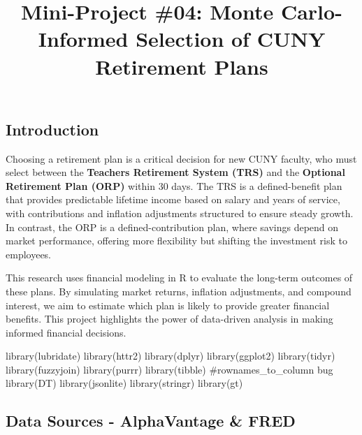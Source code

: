 \documentclass[
  letterpaper,
  DIV=11,
  numbers=noendperiod]{scrartcl}
\title{Mini-Project \#04: Monte Carlo-Informed Selection of CUNY
Retirement Plans}
\author{}
\date{}
\newenvironment{Shaded}{\begin{snugshade}}{\end{snugshade}}
\newcommand{\CommentTok}[1]{\textcolor[rgb]{0.37,0.37,0.37}{#1}}
\newcommand{\FunctionTok}[1]{\textcolor[rgb]{0.28,0.35,0.67}{#1}}
\newcommand{\NormalTok}[1]{\textcolor[rgb]{0.00,0.23,0.31}{#1}}
\renewcommand*\contentsname{Table of contents}
\newcommand\contentsname{Table of contents}
\begin{document}
\maketitle

\renewcommand*\contentsname{Outline}
{
\hypersetup{linkcolor=}
\setcounter{tocdepth}{2}
\tableofcontents
}

\subsection{Introduction}\label{introduction}

Choosing a retirement plan is a critical decision for new CUNY faculty,
who must select between the \textbf{Teachers Retirement System (TRS)}
and the \textbf{Optional Retirement Plan (ORP)} within 30 days. The TRS
is a defined-benefit plan that provides predictable lifetime income
based on salary and years of service, with contributions and inflation
adjustments structured to ensure steady growth. In contrast, the ORP is
a defined-contribution plan, where savings depend on market performance,
offering more flexibility but shifting the investment risk to employees.

This research uses financial modeling in R to evaluate the long-term
outcomes of these plans. By simulating market returns, inflation
adjustments, and compound interest, we aim to estimate which plan is
likely to provide greater financial benefits. This project highlights
the power of data-driven analysis in making informed financial
decisions.

\begin{Shaded}
\begin{Highlighting}[]
\FunctionTok{library}\NormalTok{(lubridate)}
\FunctionTok{library}\NormalTok{(httr2)}
\FunctionTok{library}\NormalTok{(dplyr)}
\FunctionTok{library}\NormalTok{(ggplot2)}
\FunctionTok{library}\NormalTok{(tidyr)}
\FunctionTok{library}\NormalTok{(fuzzyjoin)}
\FunctionTok{library}\NormalTok{(purrr)}
\FunctionTok{library}\NormalTok{(tibble) }\CommentTok{\#rownames\_to\_column bug}
\FunctionTok{library}\NormalTok{(DT)}
\FunctionTok{library}\NormalTok{(jsonlite)}
\FunctionTok{library}\NormalTok{(stringr)}
\FunctionTok{library}\NormalTok{(gt)}
\end{Highlighting}
\end{Shaded}

\subsection{Data Sources - AlphaVantage \&
FRED}\label{data-sources---alphavantage-fred}
\end{document}
